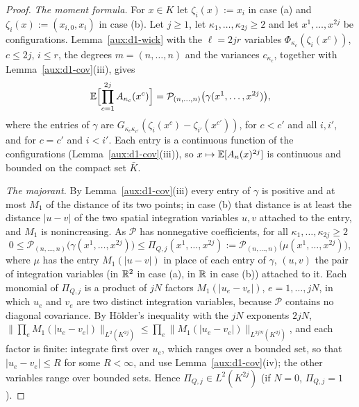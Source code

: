 \begin{proof}
\emph{The moment formula.} For $x\in K$ let $\zeta_i(x):=x_i$ in case (a) and
$\zeta_i(x):=(x_{i,0},x_i)$ in case (b). Let $j\ge1$, let $\kappa_1,\dots,\kappa_{2j}\ge2$ and
let $x^1,\dots,x^{2j}$ be configurations. Lemma~\ref{aux:d1-wick} with the $\ell=2jr$ variables
$\Phi_{\kappa_c}(\zeta_i(x^c))$, $c\le2j$, $i\le r$, the degrees $m=(n,\dots,n)$ and the
variances $c_{\kappa_c}$, together with Lemma~\ref{aux:d1-cov}(iii), gives
\begin{equation}\label{eq:d1-two}
 \mathbb{E}\Bigl[\prod_{c=1}^{2j}A_{\kappa_c}(x^c)\Bigr]
 =\mathcal P_{(n,\dots,n)}\bigl(\gamma(x^1,\dots,x^{2j})\bigr),
\end{equation}
where the entries of $\gamma$ are $G_{\kappa_c\kappa_{c'}}(\zeta_i(x^c)-\zeta_{i'}(x^{c'}))$,
for $c<c'$ and all $i,i'$, and for $c=c'$ and $i<i'$. Each entry is a continuous function of
the configurations (Lemma~\ref{aux:d1-cov}(iii)), so
$x\mapsto\mathbb{E}[A_\kappa(x)^{2j}]$ is continuous and bounded on the compact set $\bar K$.

\emph{The majorant.} By Lemma~\ref{aux:d1-cov}(iii) every entry of $\gamma$ is positive and
at most $M_1$ of the distance of its two points; in case (b) that distance is at least the
distance $|u-v|$ of the two spatial integration variables $u,v$ attached to the entry, and
$M_1$ is nonincreasing. As $\mathcal P$ has nonnegative coefficients, for all
$\kappa_1,\dots,\kappa_{2j}\ge2$
\begin{equation}\label{eq:d1-major}
 0\le\mathcal P_{(n,\dots,n)}\bigl(\gamma(x^1,\dots,x^{2j})\bigr)\le
 \Pi_{Q,j}(x^1,\dots,x^{2j}):=\mathcal P_{(n,\dots,n)}\bigl(\mu(x^1,\dots,x^{2j})\bigr),
\end{equation}
where $\mu$ has the entry $M_1(|u-v|)$ in place of each entry of $\gamma$, $(u,v)$ the pair of
integration variables (in $\mathbb{R}^2$ in case (a), in $\mathbb{R}$ in case (b)) attached to it. Each
monomial of $\Pi_{Q,j}$ is a product of $jN$ factors $M_1(|u_e-v_e|)$, $e=1,\dots,jN$, in which
$u_e$ and $v_e$ are two distinct integration variables, because $\mathcal P$ contains no
diagonal covariance. By H\"older's inequality with the $jN$ exponents $2jN$,
$\|\prod_eM_1(|u_e-v_e|)\|_{L^2(K^{2j})}\le\prod_e\|M_1(|u_e-v_e|)\|_{L^{2jN}(K^{2j})}$, and each
factor is finite: integrate first over $u_e$, which ranges over a bounded set, so that
$|u_e-v_e|\le R$ for some $R<\infty$, and use Lemma~\ref{aux:d1-cov}(iv); the other variables
range over bounded sets. Hence $\Pi_{Q,j}\in L^2(K^{2j})$ (if $N=0$, $\Pi_{Q,j}=1$).


\end{proof}
